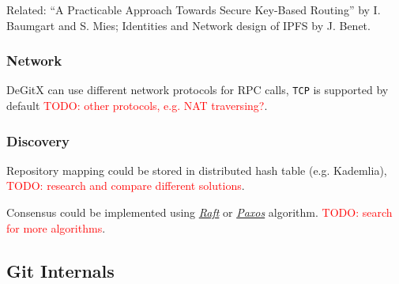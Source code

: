 \documentclass[12pt,oneside]{article}
\newcommand{\code}[1]{\texttt{#1}}
\newcommand{\todo}[1]{\textcolor{red}{TODO: #1}}
\begin{document}
Related: ``A Practicable Approach Towards Secure Key-Based Routing'' by I. Baumgart and S. Mies;
Identities and Network design of IPFS by J. Benet.

\subsubsection{Network}
DeGitX can use different network protocols for RPC calls, \code{TCP} is supported by default
\todo{other protocols, e.g. NAT traversing?}.

\subsubsection{Discovery}
\label{sec:discovery}
Repository mapping could be stored in distributed hash table (e.g. Kademlia),
\todo{research and compare different solutions}.

Consensus could be implemented using \emph{\href{https://raft.github.io/raft.pdf}{Raft}} or
\emph{\href{http://www.cs.yale.edu/homes/aspnes/pinewiki/Paxos.html}{Paxos}} algorithm.
\todo{search for more algorithms}.

\subsection{Git Internals}
\end{document}
